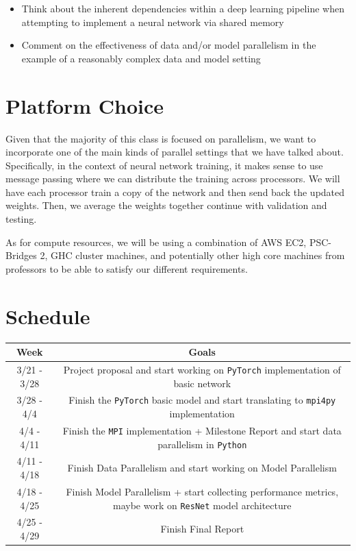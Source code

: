 \documentclass{article}
\begin{document}
\begin{itemize}
  \item Think about the inherent dependencies within a deep learning pipeline when attempting to implement a neural network via shared memory
  \item Comment on the effectiveness of data and/or model parallelism in the example of a reasonably complex data and model setting
\end{itemize}

\section*{Platform Choice} Given that the majority of this class is focused on parallelism, we want to incorporate one of the main kinds of parallel settings that we have talked about. Specifically, in the context of neural network training, it makes sense to use message passing where we can distribute the training across processors. We will have each processor train a copy of the network and then send back the updated weights. Then, we average the weights together continue with validation and testing.

As for compute resources, we will be using a combination of AWS EC2, PSC-Bridges 2, GHC cluster machines, and potentially other high core machines from professors to be able to satisfy our different requirements.

\section*{Schedule}

\begin{center}
	\begin{tabular}{ |c|c| }
		\hline
		Week & Goals \\
		\hline
		3/21 - 3/28 & Project proposal and start working on \texttt{PyTorch} implementation of basic network \\
		\hline
		3/28 - 4/4 & Finish the \texttt{PyTorch} basic model and start translating to \texttt{mpi4py} implementation\\
		\hline
		4/4 - 4/11 & Finish the \texttt{MPI} implementation + Milestone Report and start data parallelism in \texttt{Python} \\
		\hline
		4/11 - 4/18 & Finish Data Parallelism and start working on Model Parallelism\\
		\hline
		4/18 - 4/25 & Finish Model Parallelism + start collecting performance metrics, maybe work on \texttt{ResNet} model architecture\\
		\hline
		4/25 - 4/29 & Finish Final Report\\
		\hline
	\end{tabular}\\
\end{center}
\end{document}

